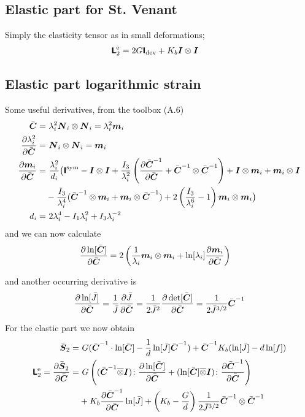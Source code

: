 \documentclass[a4paper,11pt]{article}
\newcommand{\ootimes}{\overline{\otimes}}
\newcommand{\tf}[1]{\text{\boldmath $\sf #1$}}
\newcommand{\ts}[1]{\text{\boldmath $#1$}}
\newcommand{\pderiv}[2]{\frac{\partial #1}{\partial #2}}
\newcommand{\dev}{{\rm dev}}
\newcommand{\sym}{{\rm sym}}
\newcommand{\rme}{{\rm e}}
\begin{document}
\subsection{Elastic part for St. Venant}
Simply the elasticity tensor as in small deformations;
\begin{align*}
	\tf L_2^\rme &= 2 G \tf I_\dev + K_b \ts I\otimes \ts I
\end{align*}

\subsection{Elastic part logarithmic strain}
Some useful derivatives, from the toolbox (A.6)
\begin{align*}
	\bar{\ts C} =&\ \lambda_i^2 \ts N_i \otimes \ts N_i = \lambda_i^2\ts m_i\\
	\pderiv{\lambda_i^2}{\bar{\ts C}} =&\ \ts N_i \otimes \ts N_i = \ts m_i\\
	\pderiv{\ts m_i}{\bar{\ts C}} =&\ \frac{\lambda_i^2}{d_i}\big(\tf I^\sym - \ts I\otimes\ts I +
		\frac{I_3}{\lambda_i^2}\left(\pderiv{\bar{\ts C}^{-1}}{\bar{\ts C}}+\bar{\ts C}^{-1}\otimes\bar{\ts C}^{-1}\right) +\ts I\otimes\ts m_i + \ts m_i\otimes\ts I \\
		& - \frac{I_3}{\lambda_i^4}(\bar{\ts C}^{-1}\otimes\ts m_i+\ts m_i\otimes \bar{\ts C}^{-1})+2\left(\frac{I_3}{\lambda_i^6}-1\right)\ts m_i\otimes\ts m_i\big)\\
	d_i =&\ 2 \lambda_i^4 - I_1 \lambda_i^2 +  I_3 \lambda_i^{-2}
\end{align*}
and we can now calculate
\begin{align*}
	\pderiv{\ln[\bar{\ts C}]}{\bar{\ts C}} &= 2\left(\frac{1}{\lambda_i}\ts m_i\otimes \ts m_i + \ln[\lambda_i]\pderiv{\ts m_i}{\bar{\ts C}}\right)
\end{align*}

and another occurring derivative is
\begin{align*}
	\pderiv{\ln[\bar J]}{\bar{\ts C}} &= \frac{1}{\bar J}\pderiv{\bar J}{\bar{\ts C}} = \frac{1}{2\bar J^2}\pderiv{\det[\bar{\ts C}]}{\bar{\ts C}} = 
		\frac{1}{2\bar J^{3/2}}\bar{\ts C}^{-1}\\
\end{align*}

For the elastic part we now obtain
\begin{align*}
	\bar{\ts S}_2 =&\ G(\bar{\ts C}^{-1}\cdot\ln[\bar{\ts C}]- \frac1d\ln[\bar J]\bar{\ts C}^{-1}) + \bar{\ts C}^{-1} K_b(\ln[\bar J]-d\ln[f])\\
	\tf L_2^\rme = \pderiv{\bar{\ts S}_2}{\bar{\ts C}} 
		=&\ G\left((\bar{\ts C}^{-1}\ootimes\ts I)\colon\pderiv{\ln[\bar{\ts C}]}{\bar{\ts C}} + (\ln[\bar{\ts C}]\ootimes\ts I)\colon\pderiv{\bar{\ts C}^{-1}}{\bar{\ts C}}\right)\\
		&+ K_b\pderiv{\bar{\ts C}^{-1}}{\bar{\ts C}}\ln[\bar J] + \left(K_b -\frac G d\right)\frac{1}{2\bar J^{3/2}}\bar{\ts C}^{-1}\otimes\bar{\ts C}^{-1}
\end{align*} 
\end{document}
